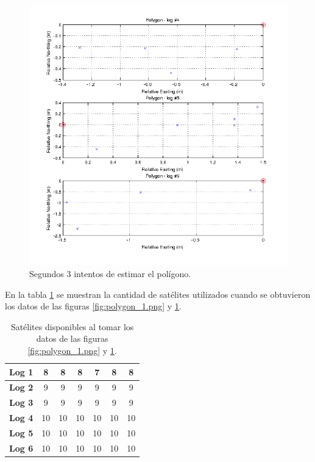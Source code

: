 \documentclass[spanish,12pt,a4paper,titlepage]{report}
\begin{document}
\newpage
\begin{figure}[h!]
  \begin{center}
  \includegraphics[width=1\textwidth]{./img/polygon_2.png}
  \end{center}
  \caption{Segundos 3 intentos de estimar el polígono.}
  \label{fig:polygon_2.png}
\end{figure}

En la tabla \ref{tab:polygon-sat} se muestran la cantidad de satélites utilizados cuando se obtuvieron los datos de las figuras \ref{fig:polygon_1.png} y \ref{fig:polygon_2.png}.

\begin{table}[H]
\begin{center}
\begin{tabular}{|l||c|c|c|c|c|c|}
\hline
\textbf{Log 1} & 8 & 8 & 8 & 7 & 8 & 8 \\
\hline
\textbf{Log 2} & 9 & 9 & 9 & 9 & 9 & 9 \\
\hline
\textbf{Log 3} & 9 & 9 & 9 & 9 & 9 & 9 \\
\hline
\textbf{Log 4} & 10 & 10 & 10 & 10 & 10 & 10 \\
\hline
\textbf{Log 5} & 10 & 10 & 10 & 10 & 10 & 10 \\
\hline
\textbf{Log 6} & 10 & 10 & 10 & 10 & 10 & 10\\
\hline
\end{tabular} 
\caption{Satélites disponibles al tomar los datos de las figuras \ref{fig:polygon_1.png} y \ref{fig:polygon_2.png}.}
\label{tab:polygon-sat}
\end{center}
\end{table}
\end{document}
